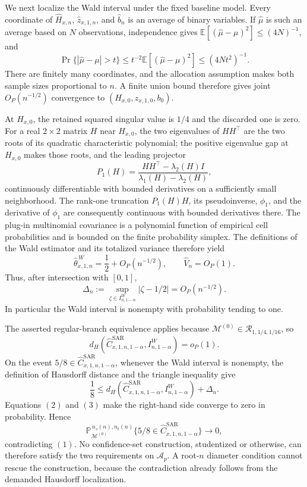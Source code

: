 We next localize the Wald interval under the fixed baseline model. Every coordinate of \(\widehat H_{x,n}\), \(\widehat z_{x,1,n}\), and \(\widehat b_n\) is an average of binary variables. If \(\widehat\mu\) is such an average based on \(N\) observations, independence gives \(\mathbb E[(\widehat\mu-\mu)^2]\le(4N)^{-1}\), and
\[
\Pr\{|\widehat\mu-\mu|>t\}
\le t^{-2}\mathbb E[(\widehat\mu-\mu)^2]
\le(4Nt^2)^{-1}.
\]
There are finitely many coordinates, and the allocation assumption makes both sample sizes proportional to \(n\). A finite union bound therefore gives joint \(O_P(n^{-1/2})\) convergence to \((H_{x,0},z_{x,1,0},b_0)\).

At \(H_{x,0}\), the retained squared singular value is \(1/4\) and the discarded one is zero. For a real \(2\times2\) matrix \(H\) near \(H_{x,0}\), the two eigenvalues of \(HH^{\top}\) are the two roots of its quadratic characteristic polynomial; the positive eigenvalue gap at \(H_{x,0}\) makes those roots, and the leading projector
\[
P_1(H)=\frac{HH^{\top}-\lambda_2(H)I}{\lambda_1(H)-\lambda_2(H)},
\]
continuously differentiable with bounded derivatives on a sufficiently small neighborhood. The rank-one truncation \(P_1(H)H\), its pseudoinverse, \(\phi_1\), and the derivative of \(\phi_1\) are consequently continuous with bounded derivatives there. The plug-in multinomial covariance is a polynomial function of empirical cell probabilities and is bounded on the finite probability simplex. The definitions of the Wald estimator and its totalized variance therefore yield
\[
\widehat\theta^{\,W}_{x,1,n}=\frac12+O_P(n^{-1/2}),
\qquad
\widehat V_n=O_P(1).
\]
Thus, after intersection with \([0,1]\),
\[
\Delta_n:=\sup_{\zeta\in I^W_{n,1-\alpha}}|\zeta-1/2|
=O_P(n^{-1/2}). \tag{2}
\]
In particular the Wald interval is nonempty with probability tending to one.

The asserted regular-branch equivalence applies because \(\mathcal M^{(0)}\in\mathcal R_{1,1/4,1/16}\), so
\[
d_H\!\left(
\widehat C^{\mathrm{SAR}}_{x,1,n,1-\alpha},I^W_{n,1-\alpha}
\right)=o_P(1). \tag{3}
\]
On the event \(5/8\in\widehat C^{\mathrm{SAR}}_{x,1,n,1-\alpha}\), whenever the Wald interval is nonempty, the definition of Hausdorff distance and the triangle inequality give
\[
\frac18
\le d_H\!\left(
\widehat C^{\mathrm{SAR}}_{x,1,n,1-\alpha},I^W_{n,1-\alpha}
\right)+\Delta_n.
\]
Equations \((2)\) and \((3)\) make the right-hand side converge to zero in probability. Hence
\[
\mathbb P_{\mathcal M^{(0)}}^{\,n_s(n),n_t(n)}
\{5/8\in\widehat C^{\mathrm{SAR}}_{x,1,n,1-\alpha}\}
\longrightarrow0,
\]
contradicting \((1)\). No confidence-set construction, studentized or otherwise, can therefore satisfy the two requirements on \(\mathcal A_p\). A root-\(n\) diameter condition cannot rescue the construction, because the contradiction already follows from the demanded Hausdorff localization.

